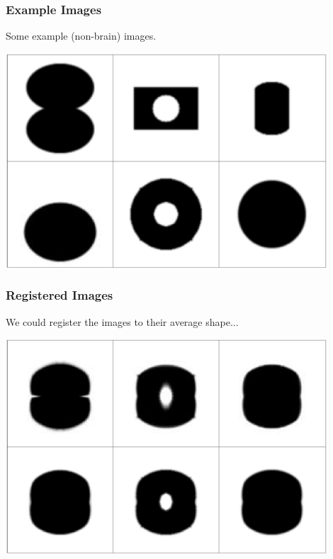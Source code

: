 \begin{frame}
\frametitle{Example Images}
Some example (non-brain) images.
\begin{center}
\includegraphics[width=0.9\textwidth]{original}
\end{center}
\end{frame}



\begin{frame}
\frametitle{Registered Images}
We could register the images to their average shape...
\begin{center}
\includegraphics[width=0.9\textwidth]{warped}
\end{center}
\end{frame}

